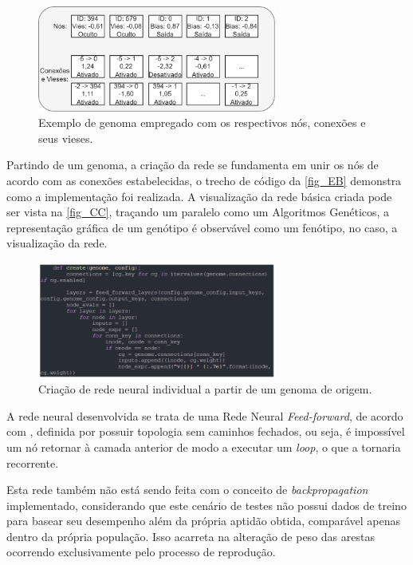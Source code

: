 \begin{figure}[htb]
        \centering
        \caption{\label{fig_EA}Exemplo de genoma empregado com os respectivos nós, conexões e seus vieses.}
        \includegraphics[width=0.7\textwidth]{images/EA.png}
\end{figure}

Partindo de um genoma, a criação da rede se fundamenta em unir os nós de acordo com as conexões estabelecidas,
o trecho de código da \autoref{fig_EB} demonstra como a implementação foi realizada. A visualização da rede básica
criada pode ser vista na \autoref{fig_CC}, traçando um paralelo como um Algoritmos Genéticos, a representação gráfica
de um genótipo é observável como um fenótipo, no caso, a visualização da rede.

\begin{figure}[htb]
        \centering
        \caption{\label{fig_EB}Criação de rede neural individual a partir de um genoma de origem.}
        \includegraphics[width=0.7\textwidth]{images/EB.png}
\end{figure}

A rede neural desenvolvida se trata de uma Rede Neural \textit{Feed-forward}, de acordo com , definida
por possuir topologia sem caminhos fechados, ou seja, é impossível um nó retornar à camada anterior de modo a executar um
\textit{loop}, o que a tornaria recorrente. 

Esta rede também não está sendo feita com o conceito de \textit{backpropagation} implementado, considerando que este cenário
de testes não possui dados de treino para basear seu desempenho além da própria aptidão obtida, comparável apenas dentro da própria população.
Isso acarreta na alteração de peso das arestas ocorrendo exclusivamente pelo processo de reprodução.

